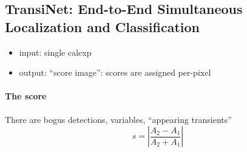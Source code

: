 \subsection{TransiNet: End-to-End Simultaneous Localization and Classification}

\begin{itemize}
  \item input: single calexp
  \item output: ``score image'': scores are assigned per-pixel
\end{itemize}


\paragraph{The score}
There are bogus detections, variables, ``appearing transients''
\begin{equation}
  s=\left| \frac{A_2-A_1}{A_2+A_1} \right|
\end{equation}













